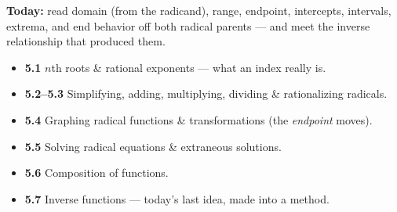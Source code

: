 \documentclass[aspectratio=169, 11pt]{beamer}
\begin{document}
\begin{frame}[t, plain]
  \textbf{Today:} read domain (from the radicand), range, endpoint, intercepts, intervals, extrema,
  and end behavior off both radical parents --- and meet the inverse relationship that produced
  them.\\[8pt]
  \begin{itemize}\setlength{\itemsep}{3pt}
    \item \textbf{5.1} $n$th roots \& rational exponents --- what an index really is.
    \item \textbf{5.2--5.3} Simplifying, adding, multiplying, dividing \& rationalizing radicals.
    \item \textbf{5.4} Graphing radical functions \& transformations (the \emph{endpoint} moves).
    \item \textbf{5.5} Solving radical equations \& extraneous solutions.
    \item \textbf{5.6} Composition of functions.
    \item \textbf{5.7} Inverse functions --- today's last idea, made into a method.
  \end{itemize}
\end{frame}
\end{document}
